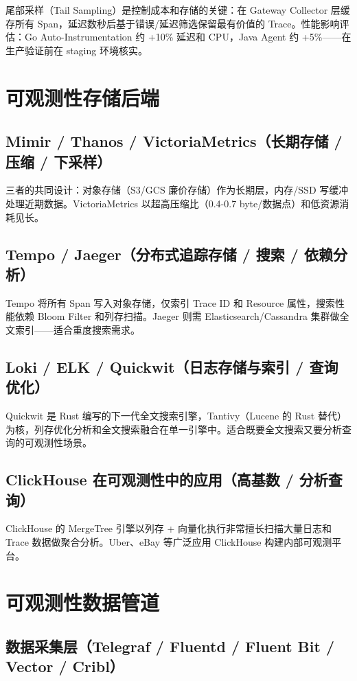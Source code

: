 \documentclass[12pt,UTF8]{ctexbook}
\begin{document}
尾部采样（Tail Sampling）是控制成本和存储的关键：在 Gateway Collector 层缓存所有 Span，延迟数秒后基于错误/延迟筛选保留最有价值的 Trace。性能影响评估：Go Auto-Instrumentation 约 +10\% 延迟和 CPU，Java Agent 约 +5\%——在生产验证前在 staging 环境核实。

  \section{可观测性存储后端}
    \subsection{Mimir / Thanos / VictoriaMetrics（长期存储 / 压缩 / 下采样）}

三者的共同设计：对象存储（S3/GCS 廉价存储）作为长期层，内存/SSD 写缓冲处理近期数据。VictoriaMetrics 以超高压缩比（0.4-0.7 byte/数据点）和低资源消耗见长。

    \subsection{Tempo / Jaeger（分布式追踪存储 / 搜索 / 依赖分析）}

Tempo 将所有 Span 写入对象存储，仅索引 Trace ID 和 Resource 属性，搜索性能依赖 Bloom Filter 和列存扫描。Jaeger 则需 Elasticsearch/Cassandra 集群做全文索引——适合重度搜索需求。

    \subsection{Loki / ELK / Quickwit（日志存储与索引 / 查询优化）}

Quickwit 是 Rust 编写的下一代全文搜索引擎，Tantivy（Lucene 的 Rust 替代）为核，列存优化分析和全文搜索融合在单一引擎中。适合既要全文搜索又要分析查询的可观测性场景。

    \subsection{ClickHouse 在可观测性中的应用（高基数 / 分析查询）}

ClickHouse 的 MergeTree 引擎以列存 + 向量化执行非常擅长扫描大量日志和 Trace 数据做聚合分析。Uber、eBay 等广泛应用 ClickHouse 构建内部可观测平台。

  \section{可观测性数据管道}
    \subsection{数据采集层（Telegraf / Fluentd / Fluent Bit / Vector / Cribl）}
\end{document}
